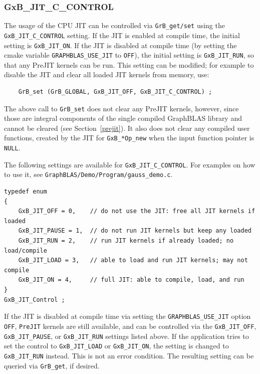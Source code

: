 \subsubsection{\sf GxB\_JIT\_C\_CONTROL}

The usage of the CPU JIT can be controlled via \verb'GrB_get/set' using the
\verb'GxB_JIT_C_CONTROL' setting.  If the JIT is enabled at compile time, the
initial setting is \verb'GxB_JIT_ON'.  If the JIT is disabled at compile time
(by setting the cmake variable \verb'GRAPHBLAS_USE_JIT' to \verb'OFF'), the
initial setting is \verb'GxB_JIT_RUN', so that any PreJIT kernels can be run.
This setting can be modified; for example to disable the JIT and clear all
loaded JIT kernels from memory, use:

\begin{verbatim}
    GrB_set (GrB_GLOBAL, GxB_JIT_OFF, GxB_JIT_C_CONTROL) ;
\end{verbatim}

The above call to \verb'GrB_set' does not clear any PreJIT kernels, however,
since those are integral components of the single compiled GraphBLAS library
and cannot be cleared (see Section~\ref{prejit}).  It also does not clear any
compiled user functions, created by the JIT for \verb'GxB_*Op_new' when the
input function pointer is \verb'NULL'.

The following settings are available for \verb'GxB_JIT_C_CONTROL'.
For examples on how to use it, see
\verb'GraphBLAS/Demo/Program/gauss_demo.c'.

{\footnotesize
\begin{verbatim}
typedef enum
{
    GxB_JIT_OFF = 0,    // do not use the JIT: free all JIT kernels if loaded
    GxB_JIT_PAUSE = 1,  // do not run JIT kernels but keep any loaded
    GxB_JIT_RUN = 2,    // run JIT kernels if already loaded; no load/compile
    GxB_JIT_LOAD = 3,   // able to load and run JIT kernels; may not compile
    GxB_JIT_ON = 4,     // full JIT: able to compile, load, and run
}
GxB_JIT_Control ;
\end{verbatim} }

If the JIT is disabled at compile time via setting the \verb'GRAPHBLAS_USE_JIT'
option \verb'OFF', \verb'PreJIT' kernels are still available, and can be
controlled via the \verb'GxB_JIT_OFF', \verb'GxB_JIT_PAUSE', or
\verb'GxB_JIT_RUN' settings listed above.  If the application tries to set the
control to \verb'GxB_JIT_LOAD' or \verb'GxB_JIT_ON', the setting is changed to
\verb'GxB_JIT_RUN' instead.  This is not an error condition.  The resulting
setting can be queried via \verb'GrB_get', if desired.

